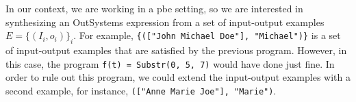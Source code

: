 In our context, we are working in a \gls{pbe} setting, so we are interested in
synthesizing an OutSystems expression from a set of input-output examples
$E = \{(I_i, o_i)\}_i$. For example,
\lstinline|{(["John Michael Doe"], "Michael")}|
is a set of input-output examples that are satisfied by the previous program.
However, in this case, the program
\lstinline|f(t) = Substr(0, 5, 7)|
would have done just fine. In order to rule out this program, we could extend
the input-output examples with a second example, for instance,
\lstinline|(["Anne Marie Joe"], "Marie")|.

